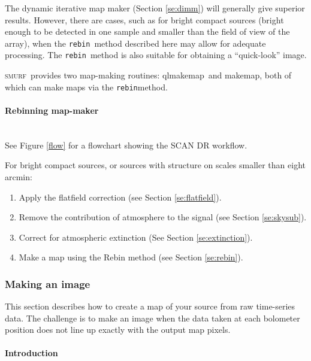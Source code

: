 \documentclass[twoside,11pt]{article}
\newcommand{\xref}[3]{#1}
\newcommand{\xlabel}[1]{}
\renewcommand{\_}{\texttt{\symbol{95}}}
\newcommand{\SMURF}{\textsc{smurf}}
\newcommand{\task}[1]{\textsf{#1}}
\newcommand{\qlmakemap}{\xref{\task{qlmakemap}}{sun258}{QLMAKEMAP}}
\newcommand{\makemap}{\xref{\task{makemap}}{sun258}{MAKEMAP}}
\newcommand{\rebin}{\texttt{rebin}}
\begin{document}
The dynamic iterative map maker (Section \ref{se:dimm}) will
generally give superior results. However, there are cases, such as for
bright compact sources (bright enough to be detected in one sample and
smaller than the field of view of the array), when the \rebin\ method
described here may allow for adequate processing. The \rebin\ method
is also suitable for obtaining a ``quick-look'' image.

\SMURF\ provides two map-making routines: \qlmakemap\ and \makemap,
both of which can make maps via the \rebin method.

\paragraph{\xlabel{rebin}Rebinning map-maker\label{se:rebin}} \ \\

See Figure \ref{flow} for a flowchart showing the SCAN DR workflow.


For bright compact sources, or sources with structure on scales
smaller than eight arcmin:
\begin{enumerate}
\item Apply the flatfield correction (see Section \ref{se:flatfield}).
\item Remove the contribution of atmosphere to the signal (see Section \ref{se:skysub}).
\item Correct for atmospheric extinction (See Section \ref{se:extinction}).
\item Make a map using the Rebin method (see Section \ref{se:rebin}).
\end{enumerate}

\subsubsection{\xlabel{imaging}Making an image\label{se:imaging}}

This section describes how to create a map of your source from raw
time-series data. The challenge is to make an image when the data
taken at each bolometer position does not line up exactly with the
output map pixels.

\paragraph{Introduction} \ \\
\end{document}
